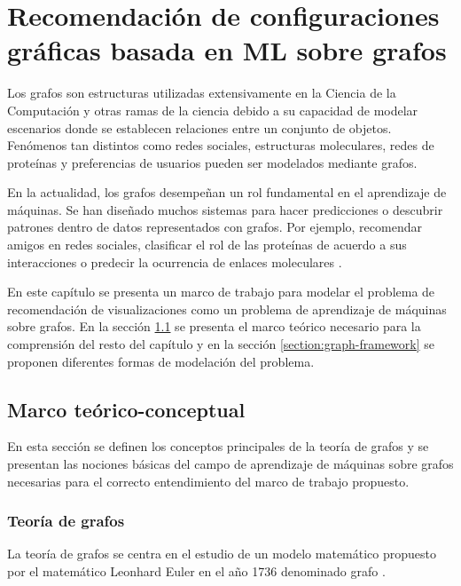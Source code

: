 \chapter{Recomendaci\'on de configuraciones gr\'aficas basada en ML sobre grafos}\label{chapter:ml-on-graphs}

Los grafos son estructuras utilizadas extensivamente en la Ciencia de la Computaci\'on y otras
ramas de la ciencia debido a su capacidad de modelar escenarios donde se establecen relaciones entre un conjunto de objetos. 
Fen\'omenos
tan distintos como redes sociales, estructuras moleculares, redes de prote\'inas y
preferencias de usuarios pueden ser modelados mediante grafos.

En la actualidad, los grafos desempe\~nan un rol fundamental en el
aprendizaje de m\'aquinas. Se han dise\~nado muchos sistemas para hacer predicciones o descubrir patrones dentro
de datos representados con grafos. Por ejemplo, recomendar amigos en
redes sociales, clasificar el rol de las prote\'inas de acuerdo a sus interacciones
o predecir la ocurrencia de enlaces moleculares \cite{hamilton2017representation}.

En este cap\'itulo se presenta un marco de trabajo para modelar
el problema de recomendaci\'on de visualizaciones como un problema
de aprendizaje de m\'aquinas sobre grafos. En la secci\'on \ref{section:theoretical-framework}
se presenta el marco te\'orico necesario para la comprensi\'on del
resto del cap\'itulo y en la secci\'on \ref{section:graph-framework} se proponen
diferentes formas de modelaci\'on del problema. 


\section{Marco te\'orico-conceptual}\label{section:theoretical-framework}

En esta secci\'on se definen los conceptos principales de la teor\'ia de grafos
y se presentan las nociones b\'asicas del campo de aprendizaje de m\'aquinas
sobre grafos necesarias para el correcto entendimiento del marco de trabajo propuesto.

\subsection{Teor\'ia de grafos}

La teor\'ia de grafos se centra en el estudio de un modelo
matem\'atico propuesto por el matem\'atico Leonhard Euler en el
a\~no 1736 denominado grafo \cite{estrada2012structure}.

